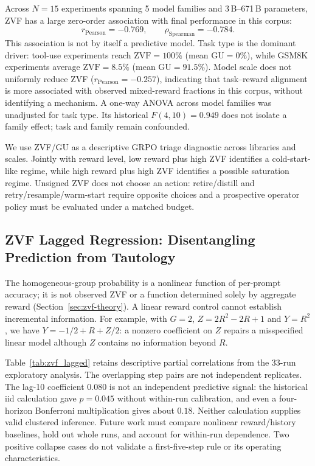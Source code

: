 Across $N = 15$ experiments spanning 5 model families and 3\,B--671\,B parameters,
ZVF has a large zero-order association with final performance in this corpus:
\[
  r_{\text{Pearson}} = -0.769, \qquad
  \rho_{\text{Spearman}} = -0.784.
\]
This association is not by itself a predictive model.  Task type is the
dominant driver: tool-use experiments reach $\mathrm{ZVF} = 100\%$
(mean $\mathrm{GU} = 0\%$), while GSM8K experiments average $\mathrm{ZVF} = 8.5\%$
(mean $\mathrm{GU} = 91.5\%$). Model scale does not uniformly reduce ZVF
($r_\text{Pearson} = -0.257$), indicating that task--reward alignment is more
associated with observed mixed-reward fractions in this corpus, without identifying a mechanism. A one-way ANOVA
across model families was unadjusted for task type. Its historical
$F(4,10)=0.949$ does not isolate a family effect; task and family remain confounded.

We use ZVF/GU as a descriptive GRPO triage diagnostic across libraries and
scales. Jointly with reward level, low reward plus high ZVF identifies a
cold-start-like regime, while high reward plus high ZVF identifies a possible
saturation regime. Unsigned ZVF does not choose an action: retire/distill and
retry/resample/warm-start require opposite choices and a prospective operator
policy must be evaluated under a matched budget.

\subsection{ZVF Lagged Regression: Disentangling Prediction from Tautology}
\label{sec:zvf-lagged}

The homogeneous-group probability is a nonlinear function of per-prompt
accuracy; it is not observed ZVF or a function determined solely by aggregate
reward (Section~\ref{sec:zvf-theory}). A linear reward control cannot establish
incremental information. For example, with $G=2$, $Z=2R^2-2R+1$ and $Y=R^2$,
we have $Y=-1/2+R+Z/2$: a nonzero coefficient on $Z$ repairs a misspecified
linear model although $Z$ contains no information beyond $R$.

Table~\ref{tab:zvf_lagged} retains descriptive partial correlations from the
33-run exploratory analysis. The overlapping step pairs are not independent
replicates. The lag-10 coefficient $0.080$ is not an independent predictive
signal: the historical iid calculation gave $p=0.045$ without within-run
calibration, and even a four-horizon Bonferroni multiplication gives about
$0.18$. Neither calculation supplies valid clustered inference. Future work
must compare nonlinear reward/history baselines, hold out whole runs, and
account for within-run dependence. Two positive collapse cases do not validate
a first-five-step rule or its operating characteristics.

